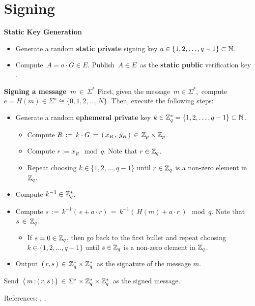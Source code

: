 
\section{Signing}
\setcounter{theorem}{0}
\setcounter{equation}{0}

\vskip 0.2cm
\noindent
\textbf{Static Key Generation}
\begin{itemize}
\item
	Generate a random \textbf{\color{red}static private} signing key
	$a \in \{1,2,\ldots,q-1\} \subset \mathbb{N}$.
\item
	Compute \,$A = a \cdot G \in E$.
	Publish \,$A \in E$\, as the \textbf{\color{red}static public} verification key .
\end{itemize}

\vskip 0.3cm
\noindent
\textbf{Signing a message \,$m \,\in\, \Sigma^{*}$}
\vskip 0.3cm
\noindent
First, given the message \,$m \in \Sigma^{*}$,\,
compute \,$e = H(m) \in \Sigma^{n} \cong \{0,1,2,\ldots,N\}$.
\vskip 0.3cm
\noindent
Then, execute the following steps:
\begin{itemize}
\item
	Generate a random \textbf{\color{red}ephemeral private} key
	$k \in \mathbb{Z}_{q}^{*} = \{1,2,\ldots,q-1\} \subset \mathbb{N}$.
	\begin{itemize}
	\item
		Compute $R \, := \, k \cdot G \,=\, \left(\,x_{R}\,,\,y_{R}\,\right) \,\in\, \mathbb{Z}_{p} \times \mathbb{Z}_{p}$.
	\item
		Compute $r := x_{R} \!\mod q$.\; Note that $r \in \mathbb{Z}_{q}$.
	\item
		Repeat choosing $k \in \{1,2,\ldots,q-1\}$ until $r \in \mathbb{Z}_{q}$ is a non-zero element in $\mathbb{Z}_{q}$.
	\end{itemize}
\item
	Compute $k^{-1} \in \mathbb{Z}_{q}^{*}$.
\item
	Compute $s \, := \, k^{-1}\left(\,e + a \cdot r\right) \, = \, k^{-1}\left(\,H(m) + a \cdot r\,\right)\!\!\mod q$.\;
	Note that $s \,\in\, \mathbb{Z}_{q}$.
	\begin{itemize}
	\item
		If $s = 0 \in \mathbb{Z}_{q}$, then go back to the first bullet and
		repeat choosing $k \in \{1,2,\ldots,q-1\}$
		until $s \in \mathbb{Z}_{q}$ is a non-zero element in $\mathbb{Z}_{q}$.
	\end{itemize}
\item
	Output \,$(\,r,s\,) \,\in\, \mathbb{Z}_{q}^{*} \times \mathbb{Z}_{q}^{*}$\,
	as the signature of the message $m$.
\end{itemize}
\vskip 0.3cm
\noindent
Send
\,$\left(\,m \,\overset{{\color{white}.}}{;}\,(\,r,s\,)\,\right) \,\in\, \Sigma^{*} \times \Z_{q}^{*} \times \Z_{q}^{*}$\,
as the signed message.

\vskip 0.5cm
\noindent
References: \cite{Yan2013}, \cite{Paar2010}, \cite{Garrett2005}
